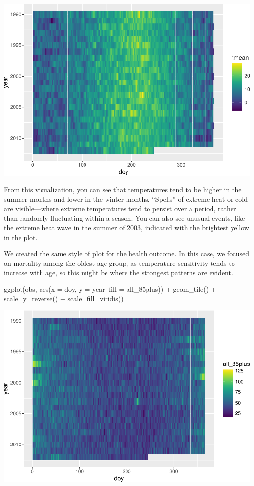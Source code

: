 \documentclass[
]{book}
\newenvironment{Shaded}{\begin{snugshade}}{\end{snugshade}}
\newcommand{\AttributeTok}[1]{\textcolor[rgb]{0.77,0.63,0.00}{#1}}
\newcommand{\FunctionTok}[1]{\textcolor[rgb]{0.00,0.00,0.00}{#1}}
\newcommand{\NormalTok}[1]{#1}
\newcommand{\SpecialCharTok}[1]{\textcolor[rgb]{0.00,0.00,0.00}{#1}}
\begin{document}
\includegraphics{adv_epi_analysis_files/figure-latex/unnamed-chunk-12-1.pdf}

From this visualization, you can see that temperatures tend to be higher in the
summer months and lower in the winter months. ``Spells'' of extreme heat or cold
are visible---where extreme temperatures tend to persist over a period, rather
than randomly fluctuating within a season. You can also see unusual events, like
the extreme heat wave in the summer of 2003, indicated with the brightest
yellow in the plot.

We created the same style of plot for the health outcome. In this case, we
focused on mortality among the oldest age group, as temperature sensitivity
tends to increase with age, so this might be where the strongest patterns are
evident.

\begin{Shaded}
\begin{Highlighting}[]
\FunctionTok{ggplot}\NormalTok{(obs, }\FunctionTok{aes}\NormalTok{(}\AttributeTok{x =}\NormalTok{ doy, }\AttributeTok{y =}\NormalTok{ year, }\AttributeTok{fill =}\NormalTok{ all\_85plus)) }\SpecialCharTok{+} 
  \FunctionTok{geom\_tile}\NormalTok{() }\SpecialCharTok{+}
  \FunctionTok{scale\_y\_reverse}\NormalTok{() }\SpecialCharTok{+} 
  \FunctionTok{scale\_fill\_viridis}\NormalTok{()}
\end{Highlighting}
\end{Shaded}

\includegraphics{adv_epi_analysis_files/figure-latex/unnamed-chunk-13-1.pdf}
\end{document}
